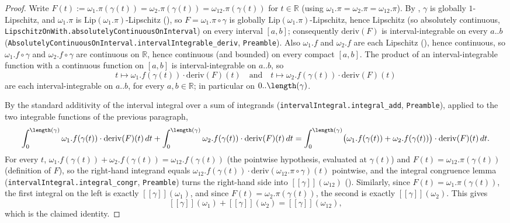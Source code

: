 \begin{proof}
  Write $F(t) := \omega_1.\pi(\gamma(t)) = \omega_2.\pi(\gamma(t)) = \omega_{12}.\pi(\gamma(t))$ for
  $t \in \mathbb{R}$ (using $\omega_1.\pi = \omega_2.\pi = \omega_{12}.\pi$). By
  , $\gamma$ is globally $1$-Lipschitz, and $\omega_1.\pi$ is
  $\mathrm{Lip}(\omega_1.\pi)$-Lipschitz (), so $F = \omega_1.\pi\circ\gamma$ is
  globally $\mathrm{Lip}(\omega_1.\pi)$-Lipschitz, hence Lipschitz (so absolutely continuous,
  \texttt{LipschitzOnWith.absolutelyContinuousOnInterval}) on every interval $[a,b]$; consequently
  $\mathrm{deriv}(F)$ is interval-integrable on every $a..b$
  (\texttt{AbsolutelyContinuousOnInterval.intervalIntegrable\_deriv}, \texttt{Preamble}). Also
  $\omega_1.f$ and $\omega_2.f$ are each Lipschitz (), hence continuous, so
  $\omega_1.f\circ\gamma$ and $\omega_2.f\circ\gamma$ are continuous on $\mathbb{R}$, hence
  continuous (and bounded) on every compact $[a,b]$. The product of an interval-integrable function
  with a continuous function on $[a,b]$ is interval-integrable on $a..b$, so
  \[
    t \mapsto \omega_1.f(\gamma(t))\cdot\mathrm{deriv}(F)(t)
    \quad\text{and}\quad
    t \mapsto \omega_2.f(\gamma(t))\cdot\mathrm{deriv}(F)(t)
  \]
  are each interval-integrable on $a..b$, for every $a,b \in \mathbb{R}$; in particular on
  $0..\length(\gamma)$.

  By the standard additivity of the interval integral over a sum of integrands
  (\texttt{intervalIntegral.integral\_add}, \texttt{Preamble}), applied to the two integrable
  functions of the previous paragraph,
  \[
    \int_0^{\length(\gamma)} \omega_1.f(\gamma(t))\cdot\mathrm{deriv}(F)(t)\,dt
    + \int_0^{\length(\gamma)} \omega_2.f(\gamma(t))\cdot\mathrm{deriv}(F)(t)\,dt
    = \int_0^{\length(\gamma)} \bigl(\omega_1.f(\gamma(t))+\omega_2.f(\gamma(t))\bigr)\cdot
      \mathrm{deriv}(F)(t)\,dt
    .
  \]
  For every $t$, $\omega_1.f(\gamma(t))+\omega_2.f(\gamma(t)) = \omega_{12}.f(\gamma(t))$ (the
  pointwise hypothesis, evaluated at $\gamma(t)$) and $F(t) = \omega_{12}.\pi(\gamma(t))$
  (definition of $F$), so the right-hand integrand equals
  $\omega_{12}.f(\gamma(t))\cdot\mathrm{deriv}(\omega_{12}.\pi\circ\gamma)(t)$ pointwise, and the
  integral congruence lemma (\texttt{intervalIntegral.integral\_congr}, \texttt{Preamble}) turns the
  right-hand side into $[[\gamma]](\omega_{12})$ (). Similarly, since $F(t) =
  \omega_1.\pi(\gamma(t))$, the first integral on the left is exactly $[[\gamma]](\omega_1)$, and
  since $F(t) = \omega_2.\pi(\gamma(t))$, the second is exactly $[[\gamma]](\omega_2)$. This gives
  \[
    [[\gamma]](\omega_1) + [[\gamma]](\omega_2) = [[\gamma]](\omega_{12})
    ,
  \]
  which is the claimed identity.
\end{proof}
